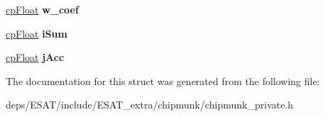 \begin{DoxyCompactItemize}
\mbox{\hyperlink{group__basic_types_gac1ed65573e035bf892505768c852d8d3}{cp\+Float}} {\bfseries w\+\_\+coef}
\item 
\mbox{\label{structcp_damped_rotary_spring_a17b3619d2dcc24424ec3d853ac3cce2a}} 
\mbox{\hyperlink{group__basic_types_gac1ed65573e035bf892505768c852d8d3}{cp\+Float}} {\bfseries i\+Sum}
\item 
\mbox{\label{structcp_damped_rotary_spring_a85cb4bace17f0418d471e9dff81ff54f}} 
\mbox{\hyperlink{group__basic_types_gac1ed65573e035bf892505768c852d8d3}{cp\+Float}} {\bfseries j\+Acc}
\end{DoxyCompactItemize}


The documentation for this struct was generated from the following file\+:\begin{DoxyCompactItemize}
\item 
deps/\+E\+S\+A\+T/include/\+E\+S\+A\+T\+\_\+extra/chipmunk/chipmunk\+\_\+private.\+h\end{DoxyCompactItemize}
